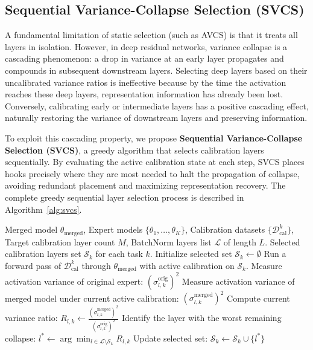 \documentclass{article}
\theoremstyle{plain}
\theoremstyle{definition}
\theoremstyle{remark}
\begin{document}
\subsection{Sequential Variance-Collapse Selection (SVCS)}
A fundamental limitation of static selection (such as AVCS) is that it treats all layers in isolation. However, in deep residual networks, variance collapse is a cascading phenomenon: a drop in variance at an early layer propagates and compounds in subsequent downstream layers. Selecting deep layers based on their uncalibrated variance ratios is ineffective because by the time the activation reaches these deep layers, representation information has already been lost. Conversely, calibrating early or intermediate layers has a positive cascading effect, naturally restoring the variance of downstream layers and preserving information.

To exploit this cascading property, we propose \textbf{Sequential Variance-Collapse Selection (SVCS)}, a greedy algorithm that selects calibration layers sequentially. By evaluating the active calibration state at each step, SVCS places hooks precisely where they are most needed to halt the propagation of collapse, avoiding redundant placement and maximizing representation recovery. The complete greedy sequential layer selection process is described in Algorithm~\ref{alg:svcs}.

\begin{algorithm}[tb]
\caption{Sequential Variance-Collapse Selection (SVCS)}
\label{alg:svcs}
\begin{algorithmic}[1]
 Merged model $\theta_{\text{merged}}$, Expert models $\{\theta_1, \dots, \theta_K\}$, Calibration datasets $\{\mathcal{D}_{\text{cal}}^k\}$, Target calibration layer count $M$, BatchNorm layers list $\mathcal{L}$ of length $L$.
 Selected calibration layers set $\mathcal{S}_k$ for each task $k$.
    \STATE Initialize selected set $\mathcal{S}_k \leftarrow \emptyset$
        \STATE Run a forward pass of $\mathcal{D}_{\text{cal}}^k$ through $\theta_{\text{merged}}$ with active calibration on $\mathcal{S}_k$.
            \STATE Measure activation variance of original expert: $(\sigma^{\text{orig}}_{l,k})^2$
            \STATE Measure activation variance of merged model under current active calibration: $(\sigma^{\text{merged}}_{l,k})^2$
            \STATE Compute current variance ratio: $R_{l,k} \leftarrow \frac{(\sigma^{\text{merged}}_{l,k})^2}{(\sigma^{\text{orig}}_{l,k})^2}$
        \ENDFOR
        \STATE Identify the layer with the worst remaining collapse:
        \STATE $l^* \leftarrow \arg\min_{l \in \mathcal{L} \setminus \mathcal{S}_k} R_{l,k}$
        \STATE Update selected set: $\mathcal{S}_k \leftarrow \mathcal{S}_k \cup \{l^*\}$
    \ENDFOR
\ENDFOR
\end{algorithmic}
\end{algorithm}
\end{document}
